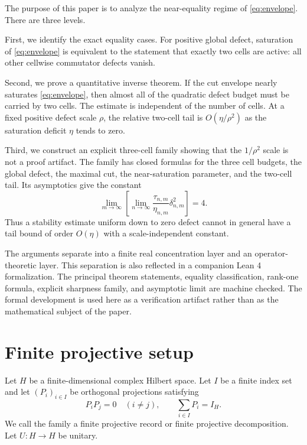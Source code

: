 \documentclass[11pt]{article}
\newcommand{\dd}{\delta}
\newcommand{\etaq}{\eta}
\newcommand{\tauq}{\tau}
\begin{document}
The purpose of this paper is to analyze the near-equality regime of
\eqref{eq:envelope}.  There are three levels.

First, we identify the exact equality cases.  For positive global defect,
saturation of \eqref{eq:envelope} is equivalent to the statement that exactly
two cells are active: all other cellwise commutator defects vanish.

Second, we prove a quantitative inverse theorem.  If the cut envelope nearly
saturates \eqref{eq:envelope}, then almost all of the quadratic defect budget
must be carried by two cells.  The estimate is independent of the number of
cells.  At a fixed positive defect scale $\rho$, the relative two-cell tail is
$O(\etaq/\rho^2)$ as the saturation deficit $\etaq$ tends to zero.

Third, we construct an explicit three-cell family showing that the
$1/\rho^2$ scale is not a proof artifact.  The family has closed formulas for
the three cell budgets, the global defect, the maximal cut, the
near-saturation parameter, and the two-cell tail.  Its asymptotics give the
constant
\[
  \lim_{m\to\infty}\left[
    \lim_{n\to\infty}\frac{\tauq_{n,m}}{\etaq_{n,m}}\dd_{n,m}^2
  \right]=4.
\]
Thus a stability estimate uniform down to zero defect cannot in general have
a tail bound of order $O(\etaq)$ with a scale-independent constant.

The arguments separate into a finite real concentration layer and an
operator-theoretic layer.  This separation is also reflected in a companion
Lean 4 formalization.  The principal theorem statements, equality
classification, rank-one formula, explicit sharpness family, and asymptotic
limit are machine checked.  The formal development is used here as a
verification artifact rather than as the mathematical subject of the paper.


\section{Finite projective setup}

Let $H$ be a finite-dimensional complex Hilbert space.  Let
$I$ be a finite index set and let $(P_i)_{i\in I}$ be orthogonal projections
satisfying
\begin{equation}\label{eq:decomp}
  P_iP_j=0\quad(i\neq j),
  \qquad
  \sum_{i\in I}P_i=I_H.
\end{equation}
We call the family a finite projective record or finite projective
decomposition.  Let $U:H\to H$ be unitary.
\end{document}
